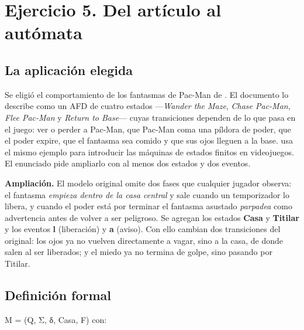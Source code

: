 \hypertarget{ejercicio-5.-del-artuxedculo-al-autuxf3mata}{%
\section{Ejercicio 5. Del artículo al autómata}\label{ejercicio-5.-del-artuxedculo-al-autuxf3mata}}

\hypertarget{la-aplicaciuxf3n-elegida}{%
\subsection{La aplicación elegida}\label{la-aplicaciuxf3n-elegida}}

Se eligió el comportamiento de los fantasmas de Pac-Man de \textcite[sec.~4, fig.~3]{gribkoff2013}. El documento lo describe como un AFD de cuatro estados ---\emph{Wander the Maze}, \emph{Chase Pac-Man}, \emph{Flee Pac-Man} y \emph{Return to Base}--- cuyas transiciones dependen de lo que pasa en el juego: ver o perder a Pac-Man, que Pac-Man coma una píldora de poder, que el poder expire, que el fantasma sea comido y que sus ojos lleguen a la base. \textcite[cap. 9]{bourg2004} usa el mismo ejemplo para introducir las máquinas de estados finitos en videojuegos. El enunciado pide ampliarlo con al menos dos estados y dos eventos.

\textbf{Ampliación.} El modelo original omite dos fases que cualquier jugador observa: el fantasma \emph{empieza dentro de la casa central} y sale cuando un temporizador lo libera, y cuando el poder está por terminar el fantasma asustado \emph{parpadea} como advertencia antes de volver a ser peligroso. Se agregan los estados \textbf{Casa} y \textbf{Titilar} y los eventos \textbf{l} (liberación) y \textbf{a} (aviso). Con ello cambian dos transiciones del original: los ojos ya no vuelven directamente a vagar, sino a la casa, de donde salen al ser liberados; y el miedo ya no termina de golpe, sino pasando por Titilar.

\hypertarget{definiciuxf3n-formal}{%
\subsection{Definición formal}\label{definiciuxf3n-formal}}

M = (Q, Σ, δ, Casa, F) con:

